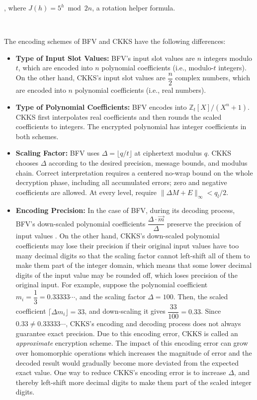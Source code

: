 , where $J(h) = 5^h \bmod 2n$, a rotation helper formula.


$ $

The encoding schemes of BFV and CKKS have the following differences:

\begin{itemize}
\item \textbf{Type of Input Slot Values:} BFV's input slot values are ${n}$ integers modulo $t$, which are encoded into $n$ polynomial coefficients (i.e., modulo-$t$ integers). On the other hand, CKKS's input slot values are $\dfrac{n}{2}$ complex numbers, which are encoded into $n$ polynomial coefficients (i.e., real numbers).

\item \textbf{Type of Polynomial Coefficients:} BFV encodes into $\mathbb{Z}_t[X]/(X^n+1)$. CKKS first interpolates real coefficients and then rounds the scaled coefficients to integers. The encrypted polynomial has integer coefficients in both schemes.

\item \textbf{Scaling Factor:} BFV uses $\Delta=\lfloor q/t\rfloor$ at ciphertext modulus $q$. CKKS chooses $\Delta$ according to the desired precision, message bounds, and modulus chain. Correct interpretation requires a centered no-wrap bound on the whole decryption phase, including all accumulated errors; zero and negative coefficients are allowed. At every level, require $\|\Delta M+E\|_\infty<q_l/2$.

\item \textbf{Encoding Precision:} In the case of BFV, during its decoding process, BFV's down-scaled polynomial coefficients $\dfrac{ \Delta\cdot \vec{m} }{\Delta}$ preserve the precision of input values
. On the other hand, CKKS's down-scaled polynomial coefficients may lose their precision if their original input values have too many decimal digits so that the scaling factor cannot left-shift all of them to make them part of the integer domain, which means that some lower decimal digits of the input value may be rounded off, which loses precision of the original input. For example, suppose the polynomial coefficient $m_i = \dfrac{1}{3} = 0.33333\cdots$, and the scaling factor $\Delta = 100$. Then, the scaled coefficient $\lceil \Delta m_i \rfloor = 33$, and down-scaling it gives $\dfrac{33}{100} = 0.33$. Since $0.33 \neq 0.33333\cdots$, CKKS's encoding and decoding process does not always guarantee exact precision. Due to this encoding error, CKKS is called an \textit{approximate} encryption scheme. The impact of this encoding error can grow over homomorphic operations which increases the magnitude of error and the decoded result would gradually become more deviated from the expected exact value. One way to reduce CKKS's encoding error is to increase $\Delta$, and thereby left-shift more decimal digits to make them part of the scaled integer digits.

\end{itemize}

